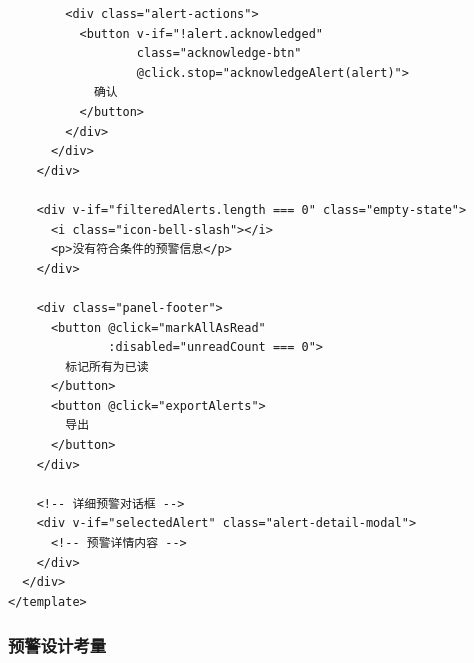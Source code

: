 \begin{lstlisting}
        <div class="alert-actions">
          <button v-if="!alert.acknowledged" 
                  class="acknowledge-btn"
                  @click.stop="acknowledgeAlert(alert)">
            确认
          </button>
        </div>
      </div>
    </div>
    
    <div v-if="filteredAlerts.length === 0" class="empty-state">
      <i class="icon-bell-slash"></i>
      <p>没有符合条件的预警信息</p>
    </div>
    
    <div class="panel-footer">
      <button @click="markAllAsRead" 
              :disabled="unreadCount === 0">
        标记所有为已读
      </button>
      <button @click="exportAlerts">
        导出
      </button>
    </div>
    
    <!-- 详细预警对话框 -->
    <div v-if="selectedAlert" class="alert-detail-modal">
      <!-- 预警详情内容 -->
    </div>
  </div>
</template>
\end{lstlisting}

\subsubsection{预警设计考量}\label{ux9884ux8b66ux8bbeux8ba1ux8003ux91cf}

